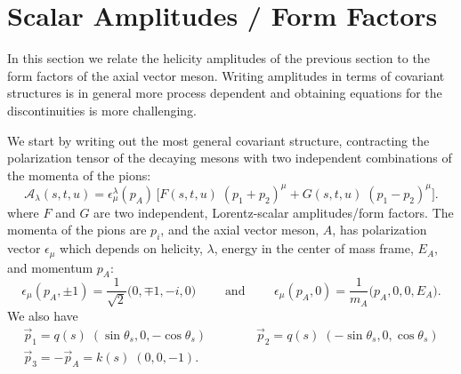 \documentclass[10pt, aps,prd,amsmath,amssymb,superscriptaddress,onecolumn,
nofootinbib,showpacs,preprintnumbers]{revtex4-1}
\begin{document}
\section{Scalar Amplitudes / Form Factors}

In this section we relate the helicity amplitudes of the previous section to the form factors of the axial vector meson. Writing amplitudes in terms of covariant structures is in general more process dependent and obtaining equations for the discontinuities is more challenging.

  We start by writing out the most general covariant structure, contracting the polarization tensor of the decaying mesons with two independent combinations of the momenta of the pions:
  \begin{equation}
    \label{eq:covariant}
    \mathcal{A}_\lambda(s,t,u) = \epsilon_\mu^\lambda(p_A) \, \bigg[ F(s,t,u) \; (p_1 + p_2)^\mu + G(s,t,u) \;  (p_1 - p_2)^\mu \bigg].
    \end{equation}
where \(F\) and \(G\) are two independent, Lorentz-scalar amplitudes/form factors. The momenta of the pions are \(p_i\), and the axial vector meson, \(A\), has polarization vector \(\epsilon_\mu\) which depends on helicity, \(\lambda\), energy in the center of mass frame, \(E_A\), and momentum \(p_A\):
  \begin{equation}
    \label{eq:polarization}
    \epsilon_\mu(p_A, \pm1) = \frac{1}{\sqrt{2}} \big( 0, \mp 1, - i, 0 \big) \qquad \text{ and } \qquad \epsilon_\mu(p_A, 0) = \frac{1}{m_A} \big( p_A, 0, 0, E_A \big).
    \end{equation}
We also have
  \begin{gather}
    \vec{p}_1 = q(s) \; (\sin \theta_s, 0,  -\cos \theta_s) \qquad \qquad \vec{p}_2 = q(s) \; (-\sin \theta_s, 0 , \cos \theta_s ) \\
    \vec{p}_3 = - \vec{p}_A = k(s) \; (0,0,-1). \nonumber
  \end{gather}
\end{document}
